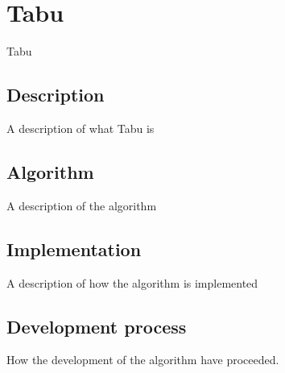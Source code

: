 \section{Tabu}
Tabu\par
\subsection{Description}
A description of what Tabu is
\subsection{Algorithm}
A description of the algorithm
\subsection{Implementation}
A description of how the algorithm is implemented
\subsection{ Development process}
How the development of the algorithm have proceeded.